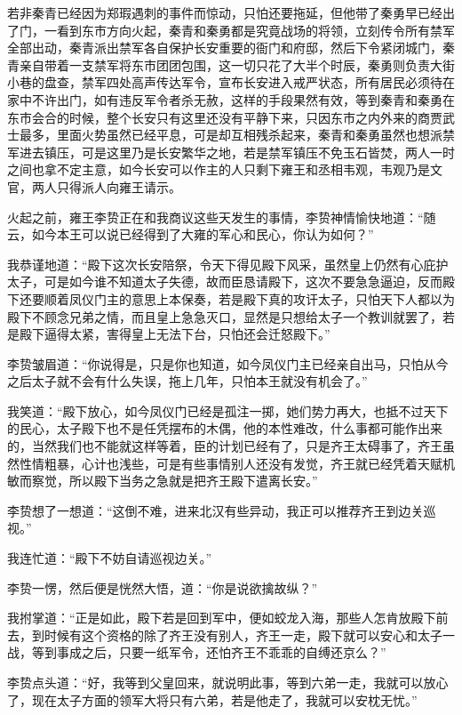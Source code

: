 若非秦青已经因为郑瑕遇刺的事件而惊动，只怕还要拖延，但他带了秦勇早已经出了门，一看到东市方向火起，秦青和秦勇都是究竟战场的将领，立刻传令所有禁军全部出动，秦青派出禁军各自保护长安重要的衙门和府邸，然后下令紧闭城门，秦青亲自带着一支禁军将东市团团包围，这一切只花了大半个时辰，秦勇则负责大街小巷的盘查，禁军四处高声传达军令，宣布长安进入戒严状态，所有居民必须待在家中不许出门，如有违反军令者杀无赦，这样的手段果然有效，等到秦青和秦勇在东市会合的时候，整个长安只有这里还没有平静下来，只因东市之内外来的商贾武士最多，里面火势虽然已经平息，可是却互相残杀起来，秦青和秦勇虽然也想派禁军进去镇压，可是这里乃是长安繁华之地，若是禁军镇压不免玉石皆焚，两人一时之间也拿不定主意，如今长安可以作主的人只剩下雍王和丞相韦观，韦观乃是文官，两人只得派人向雍王请示。

火起之前，雍王李贽正在和我商议这些天发生的事情，李贽神情愉快地道：“随云，如今本王可以说已经得到了大雍的军心和民心，你认为如何？”

我恭谨地道：“殿下这次长安陪祭，令天下得见殿下风采，虽然皇上仍然有心庇护太子，可是如今谁不知道太子失德，故而臣恳请殿下，这次不要急急逼迫，反而殿下还要顺着凤仪门主的意思上本保奏，若是殿下真的攻讦太子，只怕天下人都以为殿下不顾念兄弟之情，而且皇上急急灭口，显然是只想给太子一个教训就罢了，若是殿下逼得太紧，害得皇上无法下台，只怕还会迁怒殿下。”

李贽皱眉道：“你说得是，只是你也知道，如今凤仪门主已经亲自出马，只怕从今之后太子就不会有什么失误，拖上几年，只怕本王就没有机会了。”

我笑道：“殿下放心，如今凤仪门已经是孤注一掷，她们势力再大，也抵不过天下的民心，太子殿下也不是任凭摆布的木偶，他的本性难改，什么事都可能作出来的，当然我们也不能就这样等着，臣的计划已经有了，只是齐王太碍事了，齐王虽然性情粗暴，心计也浅些，可是有些事情别人还没有发觉，齐王就已经凭着天赋机敏而察觉，所以殿下当务之急就是把齐王殿下遣离长安。”

李贽想了一想道：“这倒不难，进来北汉有些异动，我正可以推荐齐王到边关巡视。”

我连忙道：“殿下不妨自请巡视边关。”

李贽一愣，然后便是恍然大悟，道：“你是说欲擒故纵？”

我拊掌道：“正是如此，殿下若是回到军中，便如蛟龙入海，那些人怎肯放殿下前去，到时候有这个资格的除了齐王没有别人，齐王一走，殿下就可以安心和太子一战，等到事成之后，只要一纸军令，还怕齐王不乖乖的自缚还京么？”

李贽点头道：“好，我等到父皇回来，就说明此事，等到六弟一走，我就可以放心了，现在太子方面的领军大将只有六弟，若是他走了，我就可以安枕无忧。”

